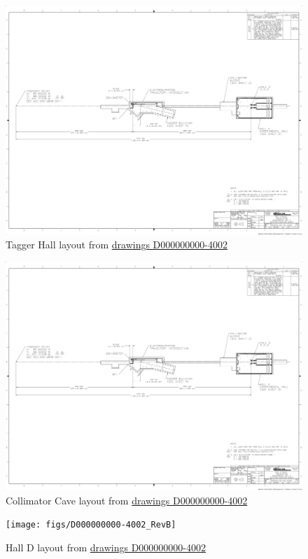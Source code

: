 \begin{figure}[h]
\begin{center}
   \includegraphics[page=4,viewport=581 1311 3020 2340,clip,angle=0,width=0.98\linewidth]{figures/D000000000-4002_RevB}
\end{center}
\caption{Tagger Hall layout
         from \href{https://misportal.jlab.org/jlabDocs/document.seam?id=80930}{drawings D000000000-4002}
        }
\label{fig:beam:tagger-hall} 
\end{figure}
\begin{figure}[h]
\begin{center}
   \includegraphics[page=3,viewport=51 811 3020 1790,clip,angle=0,width=0.98\linewidth]{figures/D000000000-4002_RevB}
\end{center}
\caption{Collimator Cave layout
         from \href{https://misportal.jlab.org/jlabDocs/document.seam?id=80930}{drawings D000000000-4002}
        }
\label{fig:beam:collimator-cave} 
\end{figure}
\begin{figure}[h]
\begin{center}
   \texttt{[image: figs/D000000000-4002\_RevB]}
\end{center}
\caption{Hall D layout
         from \href{https://misportal.jlab.org/jlabDocs/document.seam?id=80930}{drawings D000000000-4002}
        }
\label{fig:beam:hall-d} 
\end{figure}

